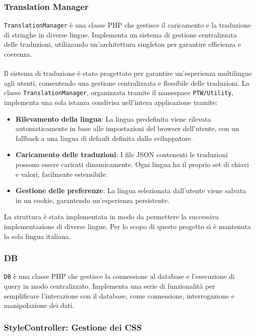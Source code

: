 \subsubsection{Translation Manager}
\texttt{TranslationManager} \`e una classe PHP che gestisce il caricamento e la traduzione di stringhe in diverse lingue. Implementa un sistema di gestione centralizzata delle traduzioni, utilizzando un'architettura singleton per garantire efficienza e coerenza.
\\\\
Il sistema di traduzione \`e stato progettato per garantire un’esperienza multilingue agli utenti, consentendo una gestione centralizzata e flessibile delle traduzioni. La classe \texttt{TranslationManager}, organizzata tramite il namespace \texttt{PTW/Utility}, implementa una sola istanza condivisa nell’intera applicazione tramite:

\begin{itemize}
    \item \textbf{Rilevamento della lingua}: La lingua predefinita viene rilevata automaticamente in base alle impostazioni del browser dell’utente, con un fallback a una lingua di default definita dallo sviluppatore.
    \item \textbf{Caricamento delle traduzioni}: I file JSON contenenti le traduzioni possono essere caricati dinamicamente. Ogni lingua ha il proprio set di chiavi e valori, facilmente estensibile.
    \item \textbf{Gestione delle preferenze}: La lingua selezionata dall’utente viene salvata in un cookie, garantendo un’esperienza persistente.
\end{itemize}

La struttura è stata implementata in modo da permettere la successiva implementazione di diverse lingue. Per lo scopo di questo progetto si è mantenuta la sola lingua italiana.

\subsubsection{DB}
\texttt{DB} \`e una classe PHP che gestisce la connessione al database e l'esecuzione di query in modo centralizzato. Implementa una serie di funzionalit\`a per semplificare l'interazione con il database, come connessione, interrogazione e manipolazione dei dati.

\subsubsection{StyleController: Gestione dei CSS}
